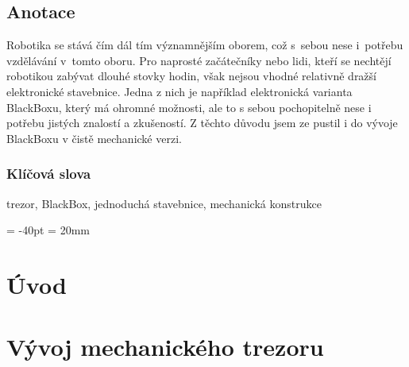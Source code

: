 \documentclass{template/priloha}
\author{Tomáš Vavrinec} %
\begin{document}
\maketitle

\pagestyle{empty}

\section*{Anotace}
\color{black}

Robotika se stává čím dál tím významnějším oborem, což s~sebou nese i~potřebu vzdělávání v~tomto oboru.
Pro naprosté začátečníky nebo lidi, kteří se nechtějí robotikou zabývat dlouhé stovky hodin, však nejsou vhodné 
relativně dražší elektronické stavebnice. Jedna z nich je například elektronická varianta BlackBoxu, který má ohromné možnosti, 
ale to s sebou pochopitelně nese i potřebu jistých znalostí a zkušeností.
Z těchto důvodu jsem ze pustil i do vývoje BlackBoxu v čistě mechanické verzi.

\subsection*{Klíčová slova}

\color{black}

trezor, BlackBox, jednoduchá stavebnice, mechanická konstrukce %

\newpage

\newpage

\tableofcontents %

\voffset = -40pt
\headsep = 20mm

\newpage

\setcounter{figure}{0}
\setcounter{table}{0}

\pagestyle{fancy}


\chapter{Úvod}
\thispagestyle{fancy}


\chapter{Vývoj mechanického trezoru}
\thispagestyle{fancy}
\label{M-vyvoj}




\end{document}
